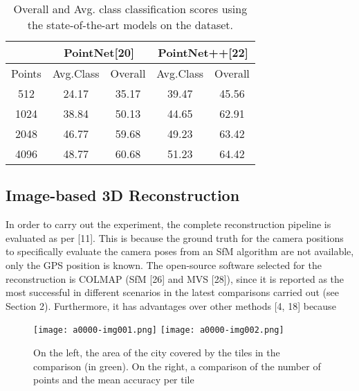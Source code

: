 \documentclass[9pt,a4paper,twoside]{tau}
\begin{document}
 \begin{table}[H]
                \centering
                \caption{Overall and Avg. class classification scores using the state-of-the-art models on the dataset.
}
    		\label{tab:table}
                \begin{tabular}{|c|c|c|c|c|}
                \toprule
                & \multicolumn{2}{|c|}{PointNet[20]} & \multicolumn{2}{|c|}{PointNet++[22]} \\
                \hline
                Points & Avg.Class & Overall & Avg.Class & Overall \\
                \hline
                512 & 24.17 & 35.17 & 39.47 & 45.56  \\
                \hline
                1024 & 38.84 & 50.13 & 44.65 & 62.91  \\
                \hline
                2048 & 46.77 & 59.68 & 49.23 & 63.42 \\
                \hline
                4096 & 48.77 & 60.68 & 51.23 & 64.42  \\
                \hline
                \end{tabular}
                    
                    
            \end{table}
    
\subsection[Image{}-based 3D Reconstruction]{Image-based 3D Reconstruction}
{In order to carry out the experiment, the complete reconstruction pipeline is evaluated as per
[11]. This is because the ground truth for the camera positions to specifically evaluate the camera poses from an SfM
algorithm are not available, only the GPS position is known. The open-source software selected for the reconstruction
is COLMAP (SfM [26] and MVS [28]), since it is reported as the most successful in different scenarios in the latest
comparisons carried out (see Section 2). }Furthermore, it has advantages over other methods [4, 18]
because





			
	       \begin{figure}[H]
                \centering
                \texttt{[image: a0000-img001.png]}
                \texttt{[image: a0000-img002.png]}
                \caption{On the left, the area of the city covered by the tiles in the comparison (in green).
On the right, a comparison of the number of points and the mean accuracy per tile}
                \label{fig:figure}
            \end{figure}
\end{document}
